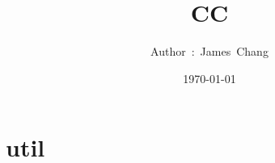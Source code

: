 

\title{CC}
\author{ {\Biohazard} \hspace{1.5mm} \hspace{1.5mm} Author\ :\ James\ Chang}
\date{\today}


\large

\tableofcontents

\chapter{util}











